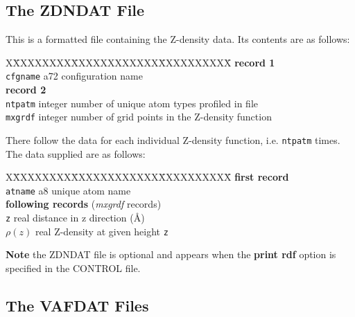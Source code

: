 \subsection{The ZDNDAT File}
\label{zdn-file}

This is a formatted file containing the Z-density data.  Its
contents are as follows:
\begin{tabbing}
X\=XXXXXXXX\=XXXXXXXXXXXX\=XXXXXXXXXX\=\kill
{\bf record 1} \\
\> {\tt cfgname} \> a72    \> configuration name \\
{\bf record 2} \\
\> {\tt ntpatm}  \> integer \> number of unique atom types profiled in file \\
\> {\tt mxgrdf}  \> integer \> number of grid points in the Z-density function\
\end{tabbing}
There follow the data for each individual Z-density function, i.e.
{\tt ntpatm} times. The data supplied are as follows:
\begin{tabbing}
X\=XXXXXXXX\=XXXXXXXXXXXX\=XXXXXXXXXX\=\kill
{\bf first record} \\
\> {\tt atname}  \> a8      \> unique atom name \\
{\bf following records} ({\em mxgrdf} records) \\
\> {\tt z}       \> real    \> distance in z direction (\AA) \\
\> $\rho(z)$     \> real    \> Z-density at given height {\tt z}
\end{tabbing}

{\bf Note} the ZDNDAT file is optional and appears when the {\bf print
rdf} option is specified in the CONTROL file.

\subsection{The VAFDAT Files}
\label{vaf-files}

